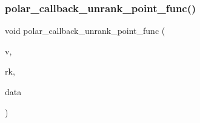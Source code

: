 \subsubsection{\texorpdfstring{polar\+\_\+callback\+\_\+unrank\+\_\+point\+\_\+func()}{polar\_callback\_unrank\_point\_func()}}
{\footnotesize\ttfamily void polar\+\_\+callback\+\_\+unrank\+\_\+point\+\_\+func (\begin{DoxyParamCaption}\item[{\mbox{\hyperlink{galois_8h_a09fddde158a3a20bd2dcadb609de11dc}{I\+NT}} $\ast$}]{v,  }\item[{\mbox{\hyperlink{galois_8h_a09fddde158a3a20bd2dcadb609de11dc}{I\+NT}}}]{rk,  }\item[{void $\ast$}]{data }\end{DoxyParamCaption})}

